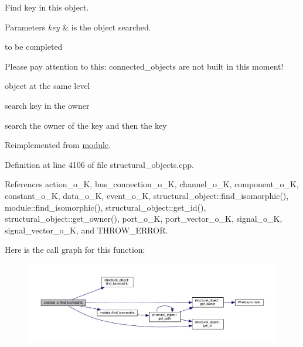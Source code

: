 Find key in this object. 


\begin{DoxyParams}{Parameters}
{\em key} & is the object searched. \\
\hline
\end{DoxyParams}
to be completed

Please pay attention to this\+: connected\+\_\+objects are not built in this moment!

object at the same level

search key in the owner

search the owner of the key and then the key 

Reimplemented from \hyperlink{classmodule_a9d8b3c8198d31d1440cb3df2fed8f346}{module}.



Definition at line 4106 of file structural\+\_\+objects.\+cpp.



References action\+\_\+o\+\_\+K, bus\+\_\+connection\+\_\+o\+\_\+K, channel\+\_\+o\+\_\+K, component\+\_\+o\+\_\+K, constant\+\_\+o\+\_\+K, data\+\_\+o\+\_\+K, event\+\_\+o\+\_\+K, structural\+\_\+object\+::find\+\_\+isomorphic(), module\+::find\+\_\+isomorphic(), structural\+\_\+object\+::get\+\_\+id(), structural\+\_\+object\+::get\+\_\+owner(), port\+\_\+o\+\_\+K, port\+\_\+vector\+\_\+o\+\_\+K, signal\+\_\+o\+\_\+K, signal\+\_\+vector\+\_\+o\+\_\+K, and T\+H\+R\+O\+W\+\_\+\+E\+R\+R\+OR.

Here is the call graph for this function\+:
\nopagebreak
\begin{figure}[H]
\begin{center}
\leavevmode
\includegraphics[width=350pt]{d3/d41/classchannel__o_a7565783de13f5451d94de9fda826710d_cgraph}
\end{center}
\end{figure}
\mbox{\label{classchannel__o_ac5409b74292b8cf624419f3368cac730}} 
